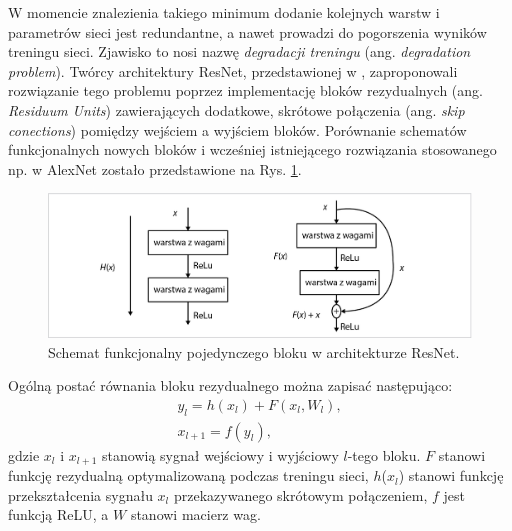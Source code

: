 W momencie znalezienia takiego minimum dodanie kolejnych warstw i parametrów sieci jest redundantne, a nawet prowadzi do pogorszenia wyników treningu sieci. Zjawisko to nosi nazwę \textit{degradacji treningu} (ang. \textit{degradation problem}). Twórcy architektury ResNet, przedstawionej w \cite{ResNet}, zaproponowali rozwiązanie tego problemu poprzez implementację bloków rezydualnych (ang. \textit{Residuum Units}) zawierających dodatkowe, skrótowe połączenia (ang. \textit{skip conections}) pomiędzy wejściem a wyjściem bloków. Porównanie schematów funkcjonalnych nowych bloków i wcześniej istniejącego rozwiązania stosowanego np. w AlexNet zostało przedstawione na Rys. \ref{ResNetBlock}.
\begin{figure}[h!]
	\centering
	\includegraphics[width=1\textwidth]{figures/ResidualBlock.png}
	\caption{Schemat funkcjonalny pojedynczego bloku w architekturze ResNet.}
	\label{ResNetBlock}
\end{figure} 

Ogólną postać równania bloku rezydualnego można zapisać następująco:
\begin{equation}
\begin{split}
y_l = h(x_l) + F(x_l, W_l),\\
x_{l+1} = f(y_l),
\end{split}
\end{equation}
gdzie $x_l$ i $x_{l+1}$ stanowią sygnał wejściowy i wyjściowy $l$-tego bloku. $F$ stanowi funkcję rezydualną optymalizowaną podczas treningu sieci, $h$($x_l$) stanowi funkcję przekształcenia sygnału $x_l$ przekazywanego skrótowym połączeniem, $f$ jest funkcją ReLU, a $W$ stanowi macierz wag.

